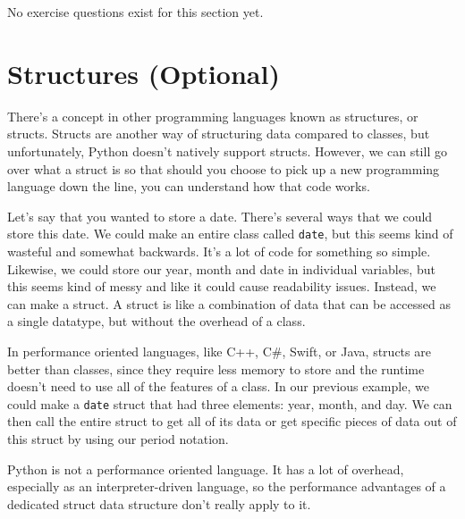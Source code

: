 No exercise questions exist for this section yet.
\section{Structures (Optional)}
There's a concept in other programming languages known as structures, or structs. Structs are another way of structuring data compared to classes, but unfortunately, Python doesn't natively support structs. However, we can still go over what a struct is so that should you choose to pick up a new programming language down the line, you can understand how that code works.\par
Let's say that you wanted to store a date. There's several ways that we could store this date. We could make an entire class called \verb|date|, but this seems kind of wasteful and somewhat backwards. It's a lot of code for something so simple. Likewise, we could store our year, month and date in individual variables, but this seems kind of messy and like it could cause readability issues. Instead, we can make a struct. A struct is like a combination of data that can be accessed as a single datatype, but without the overhead of a class.\par
In performance oriented languages, like C++, C\#, Swift, or Java, structs are better than classes, since they require less memory to store and the runtime doesn't need to use all of the features of a class. In our previous example, we could make a \verb|date| struct that had three elements: year, month, and day. We can then call the entire struct to get all of its data or get specific pieces of data out of this struct by using our period notation.\par
Python is not a performance oriented language. It has a lot of overhead, especially as an interpreter-driven language, so the performance advantages of a dedicated struct data structure don't really apply to it.\par